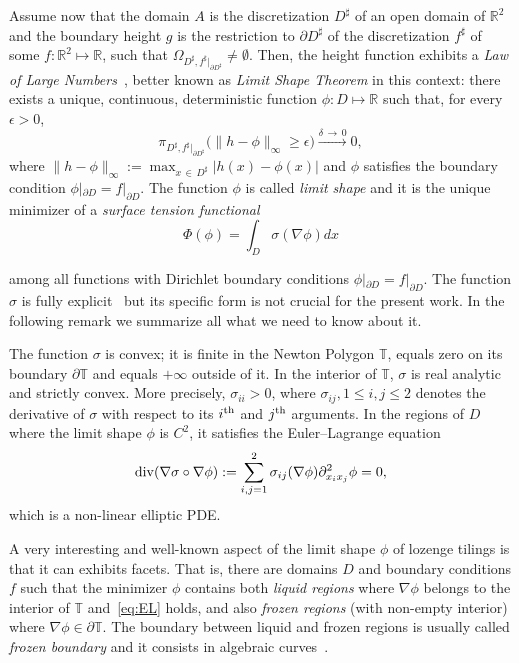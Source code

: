 \documentclass[AHL,Unicode,longabstracts,published]{cedram}
\newcommand{\R}{\mathbb{R}}
\newcommand{\bbT}{\mathbb{T}}
\renewcommand{\d}{{\sharp }}
\begin{document}
Assume now that the domain $A$ is the discretization $D^\d$ of an open domain of $\R^2$ and the boundary height $g$ is the restriction to $\partial D^\d$ of the discretization $f^\d$ of some $f:\R^2\mapsto
\R$, such that $\Omega_{D^\d,f^\d|_{\partial D^\d}}\ne\emptyset$. Then, the height function exhibits a \emph{Law of Large Numbers}~\cite{CKP,CLP}, better known as \emph{Limit Shape Theorem} in this context: there exists a unique, continuous, deterministic function $\phi:D\mapsto \R$ such that, for every $\epsilon>0$,
\begin{equation}\label{Eq:limshape}
\pi_{D^\d,f^\d|_{\partial D^\d}}\big(\|h-\phi\|_\infty\ge \epsilon\big)\stackrel{\delta\,\to\,0}\longrightarrow0,
\end{equation}
where $\|h-\phi\|_\infty:=\max_{x\,\in\,D^\d}|h(x)-\phi(x)|$ and $\phi$ satisfies the boundary condition $\phi|_{\partial D}=f|_{\partial D}$. The function $\phi$ is called \emph{limit shape} and it is the unique minimizer of a \emph{surface tension functional}
\begin{equation}
\Phi(\phi)=\int_D \sigma(\nabla \phi)dx
\end{equation}

among all functions with Dirichlet boundary conditions $\phi|_{\partial D}=f|_{\partial D}$. The function $\sigma$ is fully explicit~\cite{Kenyon-lectures} but its specific form is not crucial for the present work. In the following remark we summarize all what we need to know about it.

\begin{rema}
The function $\sigma$ is convex; it is finite in the Newton Polygon $\bbT$, equals zero on its boundary $\partial \bbT$ and equals $+\infty$ outside of it. In the interior of $\bbT$, $\sigma$ is real analytic and strictly convex. More precisely, $\sigma_{ii}>0$, where $\sigma_{ij},1\le i,j\le 2$ denotes the derivative of $\sigma$ with respect to its $i^{\rm th}$ and $j^{\rm th}$ arguments. In the regions of $D$ where the limit shape $\phi$ is $C^2$, it satisfies the Euler--Lagrange equation
\begin{equation}\label{eq:EL}
{\rm div} (\nabla\sigma\circ\nabla \phi):=\sum_{i,j=1}^2 \sigma_{ij}(\nabla\phi)\partial^2_{x_i x_j}\phi= 0,
\end{equation}
which is a non-linear elliptic PDE.
\end{rema}

A very interesting and well-known aspect of the limit shape $\phi$ of lozenge tilings is that it can exhibits facets. That is, there are domains $D$ and boundary conditions $f$ such that the minimizer $\phi$ contains both \emph{liquid regions} where $\nabla \phi$ belongs to the interior of $\bbT$ and~\eqref{eq:EL} holds, and also \emph{frozen regions} (with non-empty interior) where $\nabla\phi\in \partial
\bbT$. The boundary between liquid and frozen regions is usually called \emph{frozen boundary} and it consists in algebraic curves~\cite{Duse,KO}.
\end{document}
